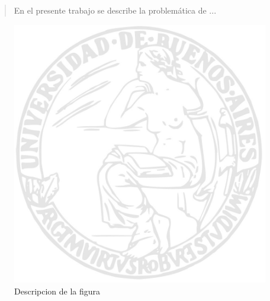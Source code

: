 \documentclass[a4paper]{article}
\begin{document}
\thispagestyle{empty}

\maketitle
\newpage

\thispagestyle{empty}
\vfill
\begin{abstract}
En el presente trabajo se describe la problemática de ...
\end{abstract}

\thispagestyle{empty}
\vspace{3cm}
\tableofcontents
\newpage


\newpage




\begin{figure}
  \begin{center}
	\includegraphics[scale=0.66]{imagenes/logouba.jpg}
	\caption{Descripcion de la figura}
	\label{nombreparareferenciar}
  \end{center}
\end{figure}
\end{document}
